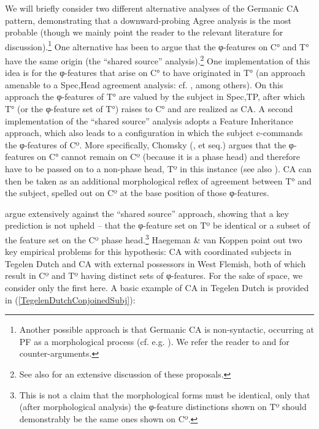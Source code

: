 \documentclass[output=paper
,modfonts
,nonflat
]{langsci/langscibook}
\begin{document}
We will briefly consider two different alternative analyses of the Germanic CA pattern, demonstrating that a downward-probing Agree analysis is the most probable (though we mainly point the reader to the relevant literature for discussion).\footnote{Another possible approach is that Germanic CA is non-syntactic, occurring at PF as a morphological process (cf. e.g. \citealt{Ackema:2004,Fuss:2008}). We refer the reader to \citet{vanKoppen:2005} and \citet{Haegeman:2012} for counter-arguments.} One alternative has been to argue that the φ-features on C° and T° have the same origin (the ``shared source'' analysis).\footnote{See also \citet{Haegeman:2012} for an extensive discussion of these proposals.} One implementation of this idea is for the φ-features that arise on C° to have originated in T° (an approach amenable to a Spec,Head agreement analysis: cf. \citealt{denBesten:1983,denBesten:1989,Zwart:1993,Zwart:1997,Hoekstra:1989,Watanabe:2000}, among others). On this approach the φ-features of T° are valued by the subject in Spec,TP, after which T° (or the φ-feature set of T°) raises to C° and are realized as CA. A second implementation of the ``shared source'' analysis adopts a Feature Inheritance approach, which also leads to a configuration in which the subject c-commands the φ-features of Cº. More specifically, Chomsky (\citeyear{Chomsky2008}, et seq.) argues that the φ-features on C° cannot remain on Cº (because it is a phase head) and therefore have to be passed on to a non-phase head, Tº in this instance (see also \citealt{Richards:2007a}). CA can then be taken as an additional morphological reflex of agreement between T° and the subject, spelled out on Cº at the base position of those φ-features. 

\citet{Haegeman:2012} argue extensively against the ``shared source'' approach, showing that a key prediction is not upheld -- that the φ-feature set on Tº be identical or a subset of the feature set on the Cº phase head.\footnote{This is not a claim that the morphological forms must be identical, only that (after morphological analysis) the φ-feature distinctions shown on Tº should demonstrably be the same ones shown on Cº.}  Haegeman \& van Koppen point out two key empirical problems for this hypothesis: CA with coordinated subjects in Tegelen Dutch and CA with external possessors in West Flemish, both of which result in Cº and Tº having distinct sets of φ-features. For the sake of space, we consider only the first here. A basic example of CA in Tegelen Dutch is provided in (\ref{TegelenDutchConjoinedSubj}):
\end{document}
